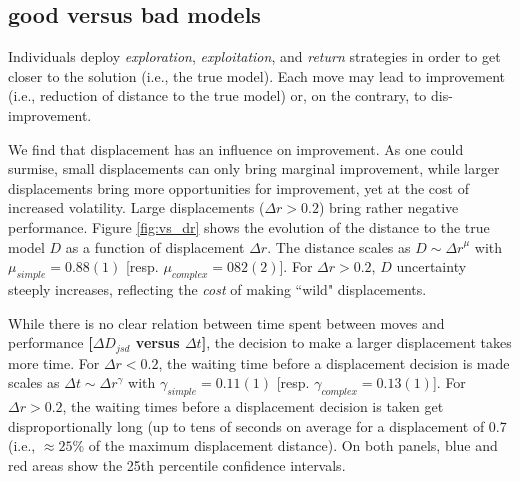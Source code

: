 %
%
%


\subsection{good versus bad models}
Individuals deploy {\it exploration}, {\it exploitation}, and {\it return} strategies in order to get closer to the solution (i.e., the true model). Each move may lead to improvement (i.e., reduction of distance to the true model) or, on the contrary, to dis-improvement. 

We find that displacement has an influence on improvement. As one could surmise, small displacements can only bring marginal improvement, while larger displacements bring more opportunities for improvement, yet at the cost of increased volatility. Large displacements ($\Delta r > 0.2$) bring rather negative performance. Figure \ref{fig:vs_dr} shows the evolution of the distance to the true model $D$ as a function of displacement $\Delta r$. The distance scales as $D \sim {\Delta r}^{\mu}$ with $\mu_{simple} = 0.88(1)$ [resp. $\mu_{complex} = 082(2)$]. For $\Delta r > 0.2$, $D$ uncertainty steeply increases, reflecting the {\it cost} of making ``wild" displacements. 

While there is no clear relation between time spent between moves and performance {\bf [$\Delta D_{jsd}$ versus $\Delta t$]}, the decision to make a larger displacement takes more time. For $\Delta r < 0.2$, the waiting time before a displacement decision is made scales as $\Delta t \sim \Delta r^{\gamma}$ with $\gamma_{simple} = 0.11(1)$ [resp. $\gamma_{complex} = 0.13(1)$]. For $\Delta r > 0.2$, the waiting times before a displacement decision is taken get disproportionally long (up to tens of seconds on average for a displacement of 0.7 (i.e., $\approx 25\%$ of the maximum displacement distance). On both panels, blue and red areas show the 25th percentile confidence intervals.


